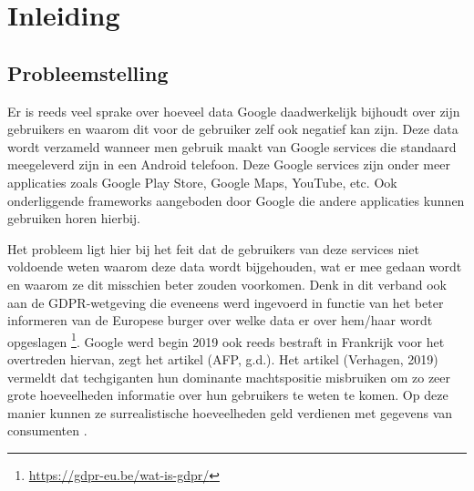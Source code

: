 
\chapter{Inleiding}
\label{ch:inleiding}




\section{Probleemstelling}
\label{sec:probleemstelling}

Er is reeds veel sprake over hoeveel data Google daadwerkelijk bijhoudt over zijn gebruikers en waarom dit voor de gebruiker zelf ook negatief kan zijn. Deze data wordt verzameld wanneer men gebruik maakt van Google services die standaard meegeleverd zijn in een Android telefoon. Deze Google services zijn onder meer applicaties zoals Google Play Store, Google Maps, YouTube, etc. Ook onderliggende frameworks aangeboden door Google die andere applicaties kunnen gebruiken horen hierbij. 

Het probleem ligt hier bij het feit dat de gebruikers van deze services niet voldoende weten waarom deze data wordt bijgehouden, wat er mee gedaan wordt en waarom ze dit misschien beter zouden voorkomen. Denk in dit verband ook aan de GDPR-wetgeving die eveneens werd ingevoerd in functie van het beter informeren van de Europese burger over welke data er over hem/haar wordt opgeslagen \footnote{\url{https://gdpr-eu.be/wat-is-gdpr/}}. Google werd begin 2019 ook reeds bestraft in Frankrijk voor het overtreden hiervan, zegt het artikel (AFP, g.d.). Het artikel (Verhagen, 2019) vermeldt dat techgiganten hun dominante machtspositie misbruiken om zo zeer grote hoeveelheden informatie over hun gebruikers te weten te komen. Op deze manier kunnen ze surrealistische hoeveelheden geld verdienen met gegevens van consumenten \autocite{propken_google-data}. 

